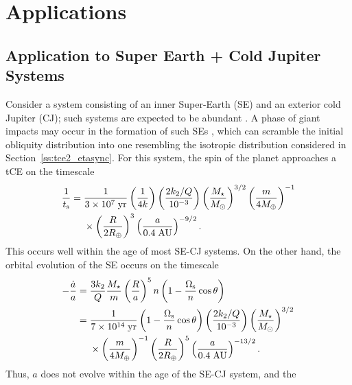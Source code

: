\documentclass[
        fleqn,
        usenatbib,
    ]{mnras}
\newcommand*{\p}[1]{\left(#1\right)}
\begin{document}
\section{Applications}\label{s:applications}

\subsection{Application to Super Earth + Cold Jupiter Systems
}\label{ss:disc_sehj}

Consider a system consisting of an inner Super-Earth (SE) and an exterior cold
Jupiter (CJ); such systems are expected to be abundant \citep{zhu2018super}. A
phase of giant impacts may occur in the formation of such SEs
\citep{inamdar2015formation, izidoro2017breaking}, which can scramble the
initial obliquity distribution into one resembling the isotropic distribution
considered in Section~\ref{ss:tce2_etasync}. For this system, the spin of the
planet approaches a tCE on the timescale
\begin{align}
    \frac{1}{t_{\rm s}} ={}& \frac{1}{3 \times 10^7\;\mathrm{yr}}
            \p{\frac{1}{4k}}
            \p{\frac{2k_2/Q}{10^{-3}}}
            \p{\frac{M_\star}{M_{\odot}}}^{3/2}
            \p{\frac{m}{4M_{\oplus}}}^{-1}\nonumber\\
        &\times \p{\frac{R}{2R_{\oplus}}}^3
            \p{\frac{a}{0.4\;\mathrm{AU}}}^{-9/2}.
\end{align}
This occurs well within the age of most SE-CJ systems. On the other hand,
the orbital evolution of the SE occurs on the timescale \citep{lai2012}
\begin{align}
    -\frac{\dot{a}}{a} ={}& \frac{3k_2}{Q}\frac{M_\star}{m}
            \p{\frac{R}{a}}^5n \p{1 - \frac{\Omega_{\rm s}}{n}\cos \theta}\nonumber\\
        ={}& \frac{1}{7 \times 10^{14}\;\mathrm{yr}}
            \p{1 - \frac{\Omega_{\rm s}}{n}\cos \theta}
            \p{\frac{2k_2/Q}{10^{-3}}}
            \p{\frac{M_\star}{M_{\odot}}}^{3/2}\nonumber\\
        &\times \p{\frac{m}{4M_{\oplus}}}^{-1}
            \p{\frac{R}{2R_{\oplus}}}^5
            \p{\frac{a}{0.4\;\mathrm{AU}}}^{-13/2}.\label{eq:sehj_adot}
\end{align}
Thus, $a$ does not evolve within the age of the SE-CJ system, and the
\end{document}
